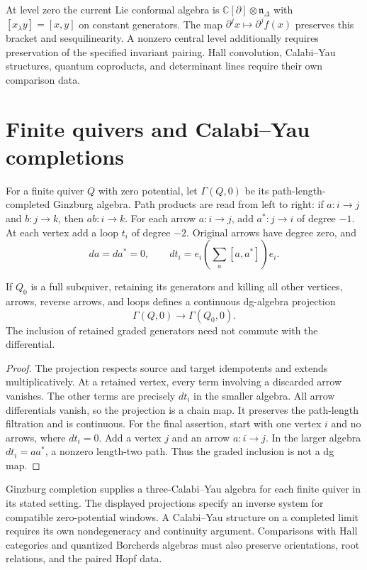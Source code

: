 At level zero the current Lie conformal algebra is
$\mathbb C[\partial]\otimes\mathfrak n_\Delta$ with
$[x_\lambda y]=[x,y]$ on constant generators.
The map $\partial^j x\mapsto\partial^j f(x)$ preserves this bracket
and sesquilinearity.
A nonzero central level additionally requires preservation of the
specified invariant pairing.
Hall convolution, Calabi--Yau structures, quantum coproducts, and
determinant lines require their own comparison data.

\chapter{Finite quivers and Calabi--Yau completions}
For a finite quiver $Q$ with zero potential, let $\Gamma(Q,0)$ be its
path-length-completed Ginzburg algebra.
Path products are read from left to right: if $a:i\to j$ and
$b:j\to k$, then $ab:i\to k$.
For each arrow $a:i\to j$, add $a^*:j\to i$ of degree $-1$.
At each vertex add a loop $t_i$ of degree $-2$.
Original arrows have degree zero, and
\[
 da=da^*=0,\qquad
 dt_i=e_i\left(\sum_a[a,a^*]\right)e_i.
\]

\begin{proposition}\label{cyiv:ginzburg-projection}
If $Q_0$ is a full subquiver, retaining its generators and killing all
other vertices, arrows, reverse arrows, and loops defines a continuous
dg-algebra projection
\[
 \Gamma(Q,0)\longrightarrow\Gamma(Q_0,0).
\]
The inclusion of retained graded generators need not commute with
the differential.
\end{proposition}
\begin{proof}
The projection respects source and target idempotents and extends
multiplicatively.
At a retained vertex, every term involving a discarded arrow vanishes.
The other terms are precisely $dt_i$ in the smaller algebra.
All arrow differentials vanish, so the projection is a chain map.
It preserves the path-length filtration and is continuous.
For the final assertion, start with one vertex $i$ and no arrows,
where $dt_i=0$.
Add a vertex $j$ and an arrow $a:i\to j$.
In the larger algebra $dt_i=aa^*$, a nonzero length-two path.
Thus the graded inclusion is not a dg map.
\end{proof}

Ginzburg completion supplies a three-Calabi--Yau algebra for each finite
quiver in its stated setting.
The displayed projections specify an inverse system for compatible
zero-potential windows.
A Calabi--Yau structure on a completed limit requires its own
nondegeneracy and continuity argument.
Comparisons with Hall categories and quantized Borcherds algebras must
also preserve orientations, root relations, and the paired Hopf data.

